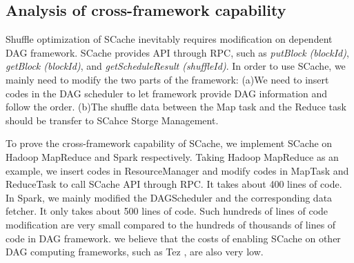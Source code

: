 {\color{blue}
\subsection{Analysis of cross-framework capability}\label{crossframework}
Shuffle optimization of SCache inevitably requires modification on dependent DAG framework. SCache provides API through RPC, such as \textit{putBlock (blockId)}, \textit{getBlock (blockId)}, and \textit{getScheduleResult (shuffleId)}. In order to use SCache, we mainly need to modify the two parts of the framework: (a)We need to insert codes in the DAG scheduler to let framework provide DAG information and follow the order. (b)The shuffle data between the Map task and the Reduce task should be transfer to SCahce Storge Management.

To prove the cross-framework capability of SCache, we implement SCache on Hadoop MapReduce and Spark respectively. Taking Hadoop MapReduce as an example, we insert codes in ResourceManager and modify codes in MapTask and ReduceTask to call SCache API through RPC. It takes about 400 lines of code. In Spark, we mainly modified the DAGScheduler and the corresponding data fetcher. 
It only takes about 500 lines of code. Such hundreds of lines of code modification are very small compared to the hundreds of thousands of lines of code in DAG framework. we believe that the costs of enabling SCache on other DAG computing frameworks, such as Tez \cite{tez}, are also very low.
}

